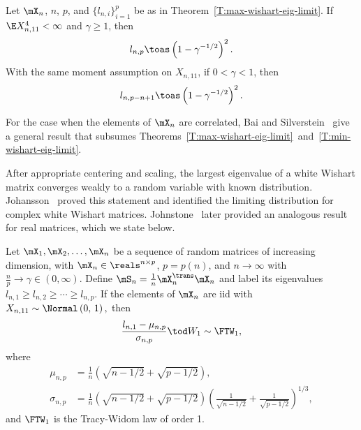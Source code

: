 \begin{theorem}\label{T:min-wishart-eig-limit}
    Let $\mX_n$, $n$, $p$, and $\{ l_{n,i} \}_{i=1}^p$ be as in
    Theorem~\ref{T:max-wishart-eig-limit}.  If $\E X_{n,11}^4 < \infty$ and
    $\gamma \geq 1$, then
    \[
        l_{n,p} \toas \left( 1 - \gamma^{-1/2} \right)^2.
    \]
    With the same moment assumption on $X_{n,11}$, if $0 < \gamma < 1$, then
    \[
        l_{n,p-n+1} \toas \left( 1 - \gamma^{-1/2} \right)^2.
    \]
\end{theorem}

\noindent
For the case when the elements of $\mX_n$ are correlated, Bai and Silverstein~\cite{bai1998neo} give a general result that subsumes Theorems~\ref{T:max-wishart-eig-limit}~and~\ref{T:min-wishart-eig-limit}.

After appropriate centering and scaling, the largest eigenvalue of a white
Wishart matrix converges weakly to a random variable with known distribution.
Johansson~\cite{johansson2000sfa} proved this statement and identified the
limiting distribution for complex white Wishart matrices.  Johnstone~\cite{johnstone2001dle} later provided an analogous result for real matrices, which we state below.  

\begin{theorem}\label{T:tw-limit-largest}
    Let $\mX_1, \mX_2, \ldots, \mX_n$ be a sequence of random matrices of
    increasing dimension, with $\mX_n \in \reals^{n\times p}$, $p = p(n)$,
    and $n \to \infty$ with $\frac{n}{p} \to \gamma \in (0, \infty)$.  Define
    $\mS_n = \frac{1}{n} \mX_n^\trans \mX_n$ and label its eigenvalues
    \(
        l_{n,1} \geq l_{n,2} \geq \cdots \geq l_{n,p}.
    \)
    If the elements of $\mX_n$ are iid with
    \(
        X_{n,11} \sim \Normal\left( 0, \, 1 \right),
    \)
    then
    \[
        \frac{l_{n,1} - \mu_{n,p}}{\sigma_{n,p}}
        \tod
        W_1
        \sim
        \FTW_1,
    \]
    where
    \begin{align*}
        \mu_{n,p} 
            &=
            \frac{1}{n}
            \left(
                \sqrt{n - 1/2}
                +
                \sqrt{p - 1/2}
            \right), \\
        \sigma_{n,p}
            &= 
            \frac{1}{n}
            \left(
                \sqrt{n - 1/2}
                +
                \sqrt{p - 1/2}
            \right)
            \left(
                \frac{1}{\sqrt{n - 1/2}}
                +
                \frac{1}{\sqrt{p - 1/2}}
            \right)^{1/3},
    \end{align*}
    and $\FTW_1$ is the Tracy-Widom law of order 1.
\end{theorem}

